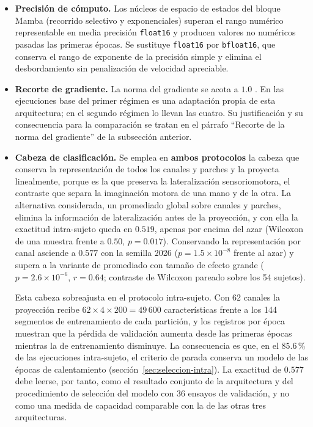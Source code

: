 \begin{itemize}
  \item \textbf{Precisión de cómputo.} Los núcleos de espacio de estados del
  bloque Mamba (recorrido selectivo y exponenciales) superan el rango numérico
  representable en media precisión \texttt{float16} y producen valores no numéricos pasadas las primeras
  épocas. Se sustituye \texttt{float16} por \texttt{bfloat16}, que conserva el
  rango de exponente de la precisión simple y elimina el desbordamiento sin
  penalización de velocidad apreciable.
  \item \textbf{Recorte de gradiente.} La norma del gradiente se acota a $1.0$
  \cite{pascanu2013difficulty}. En las ejecuciones base del primer régimen es una
  adaptación propia de esta arquitectura; en el segundo régimen lo llevan las cuatro. Su
  justificación y su consecuencia para la comparación se tratan en el párrafo ``Recorte de
  la norma del gradiente'' de la subsección anterior.
  \item \textbf{Cabeza de clasificación.} Se emplea en \textbf{ambos protocolos} la
  cabeza que conserva la representación de todos los canales y parches y la proyecta
  linealmente, porque es la que preserva la lateralización sensoriomotora, el contraste
  que separa la imaginación motora de una mano y de la otra. La alternativa considerada,
  un promediado global sobre canales y parches, elimina la información de lateralización antes de la
  proyección, y con ella la exactitud intra-sujeto queda en $0.519$, apenas por encima
  del azar (Wilcoxon de una muestra frente a $0.50$, $p = 0.017$). Conservando la
  representación por canal asciende a $0.577$ con la semilla 2026 ($p = 1.5\times10^{-8}$ frente al azar) y
  supera a la variante de promediado con tamaño de efecto grande
  ($p = 2.6\times10^{-6}$, $r = 0.64$; contraste de Wilcoxon pareado sobre los 54
  sujetos).

  Esta cabeza sobreajusta en el protocolo intra-sujeto. Con 62 canales la proyección
  recibe $62 \times 4 \times 200 = 49\,600$ características frente a los 144 segmentos de
  entrenamiento de cada partición, y los registros por época muestran que la pérdida de
  validación aumenta desde las primeras épocas mientras la de entrenamiento disminuye.
  La consecuencia es que, en el $85.6$\,\% de las ejecuciones intra-sujeto, el criterio de
  parada conserva un modelo de las épocas de calentamiento
  (sección~\ref{sec:seleccion-intra}). La exactitud de $0.577$ debe leerse, por tanto,
  como el resultado conjunto de la arquitectura y del procedimiento de selección del
  modelo con 36 ensayos de validación, y no como una medida de capacidad comparable con
  la de las otras tres arquitecturas.
\end{itemize}

